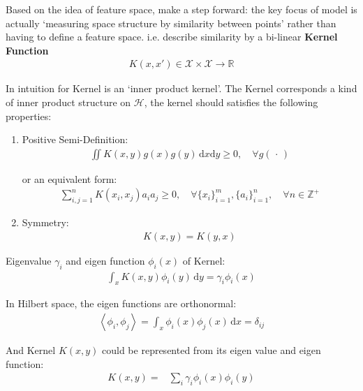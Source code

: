     Based on the idea of feature space, make a step forward: the key focus of model is actually `measuring space structure by similarity between points' rather than having to define a feature space. i.e. describe similarity by a bi-linear \textbf{Kernel Function} 
    \begin{align}\label{EqaKernelFunction}
        K(x,x') \in \mathcal{X}\times \mathcal{X}\to \mathbb{R}
    \end{align}
        
    

    In intuition for Kernel is an `inner product kernel'. The Kernel corresponds a kind of inner product structure on $ \mathcal{H} $, the kernel should satisfies the following properties:
\begin{enumerate}[topsep=2pt,itemsep=2pt]
    \item Positive Semi-Definition:
    \begin{align}
        \iint K(x,y)g(x)g(y)\,\mathrm{d}x\mathrm{d}y\geq 0,\quad \forall g(\,\cdot\,)
    \end{align}
    
    or an equivalent form:
    \begin{align}
        \sum_{i,j=1}^n K(x_i,x_j)a_ia_j\geq 0,\quad \forall \{x_i\}_{i=1}^m,\{a_i\}_{i=1}^n,\quad \forall n\in\mathbb{Z}^+ 
    \end{align}
    \item Symmetry:
    \begin{align}
        K(x,y)=K(y,x) 
    \end{align}
\end{enumerate}



Eigenvalue $ \gamma _i $ and eigen function $ \phi _i(x) $ of Kernel:
\begin{align}
     \int_x K(x,y) \phi _i(y)\,\mathrm{d}y=\gamma _i\phi_i(x)
\end{align}

    In Hilbert space, the eigen functions are orthonormal:
    \begin{align}
         \left\langle \phi _i,\phi _j\right\rangle = \int _x\phi _i(x)\phi _j(x) \,\mathrm{d}x =\delta _{ij}
    \end{align}

    And Kernel $ K(x,y) $ could be represented from its eigen value and eigen function:
    \begin{align}
        K(x,y)=&\sum_{i}\gamma _i\phi _i(x)\phi _i(y)
    \end{align}

